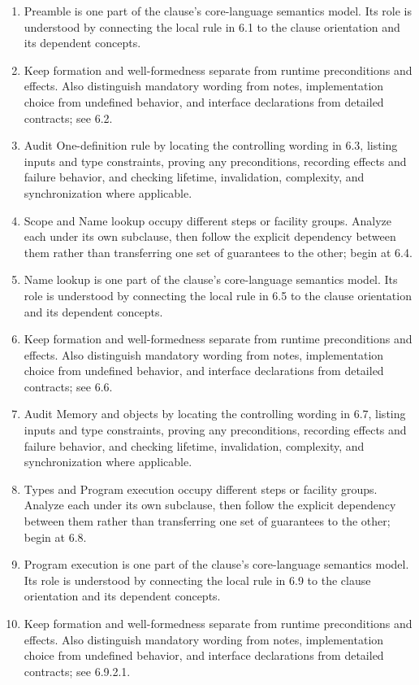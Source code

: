 \documentclass[11pt,letterpaper]{article}
\begin{document}
\begin{enumerate}
\item Preamble is one part of the clause's core-language semantics model. Its role is understood by connecting the local rule in 6.1 to the clause orientation and its dependent concepts.
\item Keep formation and well-formedness separate from runtime preconditions and effects. Also distinguish mandatory wording from notes, implementation choice from undefined behavior, and interface declarations from detailed contracts; see 6.2.
\item Audit One-definition rule by locating the controlling wording in 6.3, listing inputs and type constraints, proving any preconditions, recording effects and failure behavior, and checking lifetime, invalidation, complexity, and synchronization where applicable.
\item Scope and Name lookup occupy different steps or facility groups. Analyze each under its own subclause, then follow the explicit dependency between them rather than transferring one set of guarantees to the other; begin at 6.4.
\item Name lookup is one part of the clause's core-language semantics model. Its role is understood by connecting the local rule in 6.5 to the clause orientation and its dependent concepts.
\item Keep formation and well-formedness separate from runtime preconditions and effects. Also distinguish mandatory wording from notes, implementation choice from undefined behavior, and interface declarations from detailed contracts; see 6.6.
\item Audit Memory and objects by locating the controlling wording in 6.7, listing inputs and type constraints, proving any preconditions, recording effects and failure behavior, and checking lifetime, invalidation, complexity, and synchronization where applicable.
\item Types and Program execution occupy different steps or facility groups. Analyze each under its own subclause, then follow the explicit dependency between them rather than transferring one set of guarantees to the other; begin at 6.8.
\item Program execution is one part of the clause's core-language semantics model. Its role is understood by connecting the local rule in 6.9 to the clause orientation and its dependent concepts.
\item Keep formation and well-formedness separate from runtime preconditions and effects. Also distinguish mandatory wording from notes, implementation choice from undefined behavior, and interface declarations from detailed contracts; see 6.9.2.1.

\end{enumerate}
\end{document}
